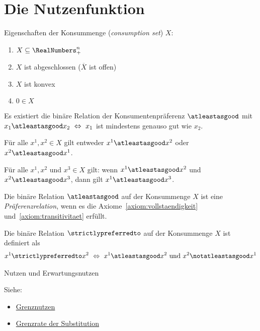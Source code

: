 \section{Die Nutzenfunktion}%
\label{sec:die_nutzenfunktion}

Eigenschaften der Konsummenge (\emph{consumption set}) $X$:
\begin{enumerate}
  \item $X \subseteq \RealNumbers^n_+$
  \item $X$ ist abgeschlossen ($\overline{X}$ ist offen)
  \item $X$ ist konvex
  \item $0 \in X$
\end{enumerate}

Es existiert die binäre Relation der Konsumentenpräferenz $\atleastasgood$ mit
$x_1 \atleastasgood x_2 \ \Leftrightarrow \ x_1$ ist mindestens genauso gut wie $x_2$.

\begin{axiom}[Vollständigkeit]
  \label{axiom:vollstaendigkeit}
  Für alle $x^1, x^2 \in X$ gilt entweder
  $x^1 \atleastasgood x^2$ oder $x^2 \atleastasgood x^1$.
\end{axiom}

\begin{axiom}[Transitivität]
  \label{axiom:transitivitaet}
  Für alle $x^1, x^2$ und $x^3 \in X$ gilt:
  wenn $x^1 \atleastasgood x^2$ und $x^2 \atleastasgood x^3$,
  dann gilt $x^1 \atleastasgood x^3$.
\end{axiom}

\begin{definition}[Präferenzrelation]
  Die binäre Relation $\atleastasgood$ auf der Konsummenge $X$ ist eine
  \emph{Präferenzrelation}, wenn es die Axiome~\ref{axiom:vollstaendigkeit}
  und~\ref{axiom:transitivitaet} erfüllt.
\end{definition}

\begin{definition}
  Die binäre Relation $\strictlypreferredto$ auf der Konsummenge $X$ ist definiert als
  \begin{align*}
    x^1 \strictlypreferredto x^2
    \ \Leftrightarrow \
    x^1 \atleastasgood x^2 \text{ und } x^2 \notatleastasgood x^1
  \end{align*}
\end{definition}


Nutzen und Erwartungsnutzen

Siehe:
\begin{itemize}
  \item \href{https://de.wikipedia.org/wiki/Grenznutzen}{Grenznutzen}
  \item \href{https://de.wikipedia.org/wiki/Grenzrate_der_Substitution}{Grenzrate der
    Substitution}
\end{itemize}

